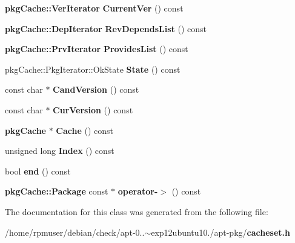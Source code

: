 \begin{DoxyCompactItemize}
\item 
{\bf pkg\-Cache\-::\-Ver\-Iterator} {\bfseries \-Current\-Ver} () const \label{classAPT_1_1PackageContainerInterface_1_1const__iterator_a291bbf4421942edc375a0b44620fb650}

\item 
{\bf pkg\-Cache\-::\-Dep\-Iterator} {\bfseries \-Rev\-Depends\-List} () const \label{classAPT_1_1PackageContainerInterface_1_1const__iterator_a1a77efd73f751005ca9a669ff57167dc}

\item 
{\bf pkg\-Cache\-::\-Prv\-Iterator} {\bfseries \-Provides\-List} () const \label{classAPT_1_1PackageContainerInterface_1_1const__iterator_ad301a5410f2dad0518ea8701941b0ef5}

\item 
pkg\-Cache\-::\-Pkg\-Iterator\-::\-Ok\-State {\bfseries \-State} () const \label{classAPT_1_1PackageContainerInterface_1_1const__iterator_ae2c4d8c0c44b34f459f4dbe6826ac06b}

\item 
const char $\ast$ {\bfseries \-Cand\-Version} () const \label{classAPT_1_1PackageContainerInterface_1_1const__iterator_acb819f6fbf70524de78c299f5d4ed1a9}

\item 
const char $\ast$ {\bfseries \-Cur\-Version} () const \label{classAPT_1_1PackageContainerInterface_1_1const__iterator_a2decffb67400b1e1aebb4b16a17abdb7}

\item 
{\bf pkg\-Cache} $\ast$ {\bfseries \-Cache} () const \label{classAPT_1_1PackageContainerInterface_1_1const__iterator_ae2cc99a8b0c3ed60e3f7343de27751f1}

\item 
unsigned long {\bfseries \-Index} () const \label{classAPT_1_1PackageContainerInterface_1_1const__iterator_ad92f189a9769780f1208e656e930db7b}

\item 
bool {\bfseries end} () const \label{classAPT_1_1PackageContainerInterface_1_1const__iterator_a71c36f24333cce752c1f32f032b7d6ba}

\item 
{\bf pkg\-Cache\-::\-Package} const $\ast$ {\bfseries operator-\/$>$} () const \label{classAPT_1_1PackageContainerInterface_1_1const__iterator_a866a1301c3a36790d12cc589f6f62911}

\end{DoxyCompactItemize}


\-The documentation for this class was generated from the following file\-:\begin{DoxyCompactItemize}
\item 
/home/rpmuser/debian/check/apt-\/0..$\sim$exp12ubuntu10./apt-\/pkg/{\bf cacheset.\-h}\end{DoxyCompactItemize}
